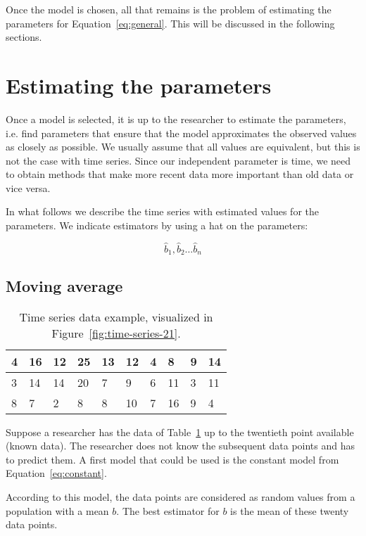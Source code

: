 Once the model is chosen, all that remains is the problem of estimating the parameters for Equation~\ref{eq:general}. This will be discussed in the following sections.

\section{Estimating the parameters}

Once a model is selected, it is up to the researcher to estimate the parameters, i.e. find parameters that ensure that the model approximates the observed values as closely as possible. We usually assume that all values are equivalent, but this is not the case with time series. Since our independent parameter is time, we need to obtain methods that make more recent data more important than old data or vice versa.

In what follows we describe the time series with estimated values for the parameters. We indicate estimators by using a hat on the parameters:

\[ \widehat{b}_{1}, \widehat{b}_{2} \dots \widehat{b}_{n} \]

\subsection{Moving average}

\begin{table}
  \centering
  \begin{tabular}{|l|l|l|l|l|l|l|l|l|l|}
    \hline
    4 & 16 & 12 & 25 & 13 & 12 & 4 & 8  & 9 & 14 \\ \hline
    3 & 14 & 14 & 20 & 7  & 9  & 6 & 11 & 3 & 11 \\ \hline
    8 & 7  & 2  & 8  & 8  & 10 & 7 & 16 & 9 & 4  \\ \hline
  \end{tabular}
  \caption{Time series data example, visualized in Figure~\ref{fig:time-series-21}.}
  \label{tab:data-time-series-21}
\end{table}

Suppose a researcher has the data of Table~\ref{tab:data-time-series-21} up to the twentieth point available (known data). The researcher does not know the subsequent data points and has to predict them. A first model that could be used is the constant model from Equation~\ref{eq:constant}.

According to this model, the data points are considered as random values from a population with a mean $b$. The best estimator for $b$ is the mean of these twenty data points.

